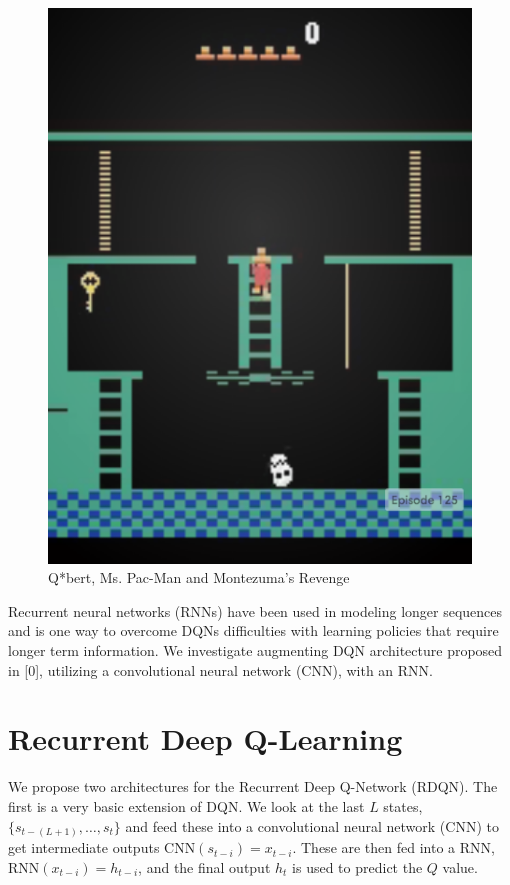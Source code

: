 \documentclass{article}
\begin{document}
\begin{figure}[h]
\begin{minipage}{0.8\textwidth}
            \centering
            \includegraphics[scale=0.15]{MontezumaRevenge}
        \end{minipage}
        \caption{Q*bert, Ms. Pac-Man and Montezuma's Revenge}
    \end{figure}
    
    Recurrent neural networks (RNNs) have been used in modeling longer sequences and
    is one way to overcome DQNs difficulties with learning policies that require longer
    term information. We investigate augmenting DQN architecture proposed in [0], utilizing
    a convolutional neural network (CNN), with an RNN.

\section{Recurrent Deep Q-Learning}
We propose two architectures for the Recurrent Deep Q-Network (RDQN). The first
is a very basic extension of DQN. We look at the last $L$ states, $\{s_{t-(L+1)},
\dots, s_{t}\}$ and feed these into a convolutional neural network (CNN) to get
intermediate outputs $\text{CNN}(s_{t-i}) = x_{t-i}$. These are then fed into a
RNN, $\text{RNN}(x_{t-i}) = h_{t-i}$, and the final output $h_t$ is used to
predict the $Q$ value.
\end{document}
